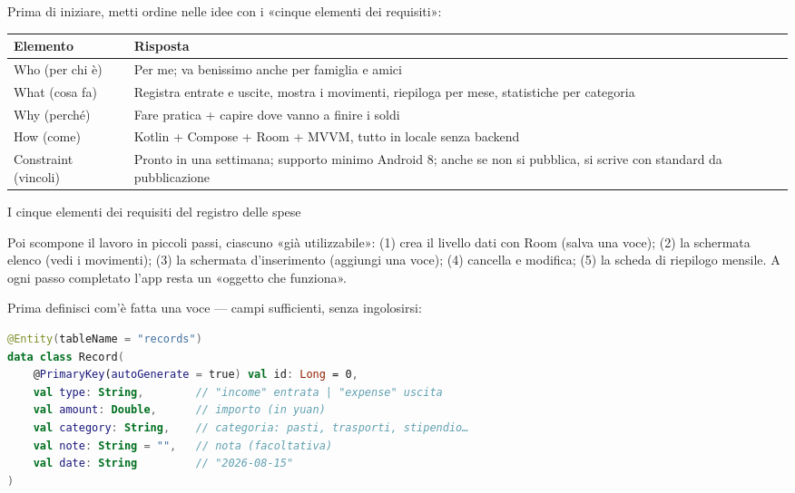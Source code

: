 


Prima di iniziare, metti ordine nelle idee con i «cinque elementi dei requisiti»:

\begin{center}
\begin{tabularx}{\linewidth}{|X|X|}
\hline
\textbf{Elemento} & \textbf{Risposta} \tabularnewline
\hline
Who (per chi è) & Per me; va benissimo anche per famiglia e amici \tabularnewline
What (cosa fa) & Registra entrate e uscite, mostra i movimenti, riepiloga per mese, statistiche per categoria \tabularnewline
Why (perché) & Fare pratica + capire dove vanno a finire i soldi \tabularnewline
How (come) & Kotlin + Compose + Room + MVVM, tutto in locale senza backend \tabularnewline
Constraint (vincoli) & Pronto in una settimana; supporto minimo Android 8; anche se non si pubblica, si scrive con standard da pubblicazione \tabularnewline
\hline
\end{tabularx}
\end{center}

\begin{center}\small\color{gray}I cinque elementi dei requisiti del registro delle spese\end{center}

Poi scompone il lavoro in piccoli passi, ciascuno «già utilizzabile»: (1) crea il livello dati con Room (salva una voce); (2) la schermata elenco (vedi i movimenti); (3) la schermata d'inserimento (aggiungi una voce); (4) cancella e modifica; (5) la scheda di riepilogo mensile. A ogni passo completato l'app resta un «oggetto che funziona».


Prima definisci com'è fatta una voce — campi sufficienti, senza ingolosirsi:

\begin{lstlisting}[language=Kotlin]
@Entity(tableName = "records")
data class Record(
    @PrimaryKey(autoGenerate = true) val id: Long = 0,
    val type: String,        // "income" entrata | "expense" uscita
    val amount: Double,      // importo (in yuan)
    val category: String,    // categoria: pasti, trasporti, stipendio…
    val note: String = "",   // nota (facoltativa)
    val date: String         // "2026-08-15"
)
\end{lstlisting}


